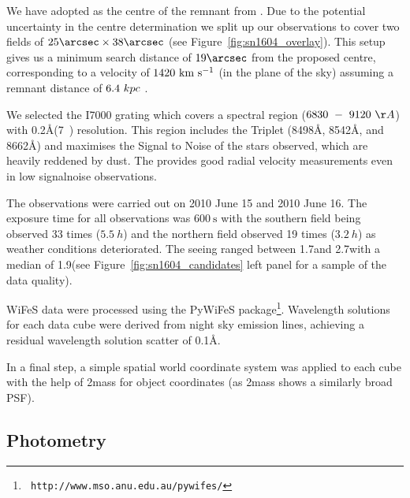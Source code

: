 \documentclass[preprint2]{aastex}
\begin{document}
We have adopted   as the centre of the remnant from \citet{2008ApJ...689..225K}. Due to the potential uncertainty in the centre determination \citep[for a more detailed discussion about the difficulty of centre determination see Section~2.2 in][]{2012ApJ...759....7K} we split up our observations to cover two fields of $25\arcsec\times38\arcsec$ (see Figure~\ref{fig:sn1604_overlay}). This setup gives us a minimum search distance of $19\arcsec$ from the proposed centre, corresponding to a velocity of $1420~\textrm{km}~\textrm{s}^{-1}$ (in the plane of the sky) assuming a remnant distance of $6.4~kpc$ \citep{2012A&A...537A.139C}. 



We selected the I7000 grating which covers a spectral region  ($6830~-~9120~\AA$) with 0.2\AA (7~\kms) resolution. This region includes the  Triplet (8498\AA, 8542\AA, and 8662\AA) and maximises the Signal to Noise of the stars observed, which are heavily reddened by dust. The  provides good radial velocity measurements even in low \gls{signalnoise} observations.

The observations were carried out  on 2010 June 15 and 2010 June 16. The exposure time for all observations was $600~\textrm{s}$ with the southern field being observed 33 times ($5.5~h$) and the northern field observed 19 times ($3.2~h$) as weather conditions deteriorated. 
The seeing ranged between 1.7\arcsec and 2.7\arcsec with a median of 1.9\arcsec (see Figure~\ref{fig:sn1604_candidates} left panel for a sample of the data quality). 

%




WiFeS data were processed using the PyWiFeS package\footnote[1]{{\tt
http://www.mso.anu.edu.au/pywifes/}}.  Wavelength solutions for each
data cube were derived from night sky emission lines, achieving a
residual wavelength solution scatter of 0.1\AA.


In a final step, a simple spatial world coordinate system was applied to each cube with the help of \gls{2mass} for object coordinates (as \gls{2mass} shows a similarly broad PSF).



\subsection{Photometry}
\end{document}
